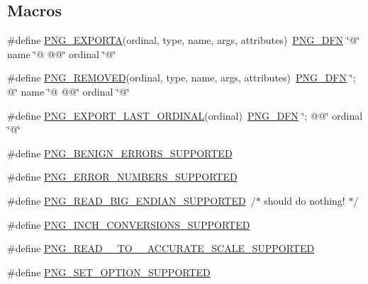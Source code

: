 \subsection*{Macros}
\begin{DoxyCompactItemize}
\item 
\#define \mbox{\hyperlink{third-party_2libpng_2scripts_2symbols_8c_a0b2856104147f9c08a8a465f93f9ed16}{P\+N\+G\+\_\+\+E\+X\+P\+O\+R\+TA}}(ordinal,  type,  name,  args,  attributes)~\mbox{\hyperlink{def_8c_a5a098e8403373ec936600e21c5205f3a}{P\+N\+G\+\_\+\+D\+FN}} \char`\"{}@\char`\"{} name \char`\"{}@ @@\char`\"{} ordinal \char`\"{}@\char`\"{}
\item 
\#define \mbox{\hyperlink{third-party_2libpng_2scripts_2symbols_8c_aeaa0b925c80a0b4c2ae0ef3beffb3c4b}{P\+N\+G\+\_\+\+R\+E\+M\+O\+V\+ED}}(ordinal,  type,  name,  args,  attributes)~\mbox{\hyperlink{def_8c_a5a098e8403373ec936600e21c5205f3a}{P\+N\+G\+\_\+\+D\+FN}} \char`\"{}; @\char`\"{} name \char`\"{}@ @@\char`\"{} ordinal \char`\"{}@\char`\"{}
\item 
\#define \mbox{\hyperlink{third-party_2libpng_2scripts_2symbols_8c_a465e7460be73c52c0f6443e78eee04eb}{P\+N\+G\+\_\+\+E\+X\+P\+O\+R\+T\+\_\+\+L\+A\+S\+T\+\_\+\+O\+R\+D\+I\+N\+AL}}(ordinal)~\mbox{\hyperlink{def_8c_a5a098e8403373ec936600e21c5205f3a}{P\+N\+G\+\_\+\+D\+FN}} \char`\"{}; @@\char`\"{} ordinal \char`\"{}@\char`\"{}
\item 
\#define \mbox{\hyperlink{third-party_2libpng_2scripts_2symbols_8c_a918f7fb0dd09bbf2e4414465198033c9}{P\+N\+G\+\_\+\+B\+E\+N\+I\+G\+N\+\_\+\+E\+R\+R\+O\+R\+S\+\_\+\+S\+U\+P\+P\+O\+R\+T\+ED}}
\item 
\#define \mbox{\hyperlink{third-party_2libpng_2scripts_2symbols_8c_a8c774f16efe436d193da1fc1bcc847e5}{P\+N\+G\+\_\+\+E\+R\+R\+O\+R\+\_\+\+N\+U\+M\+B\+E\+R\+S\+\_\+\+S\+U\+P\+P\+O\+R\+T\+ED}}
\item 
\#define \mbox{\hyperlink{third-party_2libpng_2scripts_2symbols_8c_af60a19d33ea4cf81a0fa513b3a39f483}{P\+N\+G\+\_\+\+R\+E\+A\+D\+\_\+\+B\+I\+G\+\_\+\+E\+N\+D\+I\+A\+N\+\_\+\+S\+U\+P\+P\+O\+R\+T\+ED}}~/$\ast$ should do nothing! $\ast$/
\item 
\#define \mbox{\hyperlink{third-party_2libpng_2scripts_2symbols_8c_a6a353151d7fe132476be036912d75165}{P\+N\+G\+\_\+\+I\+N\+C\+H\+\_\+\+C\+O\+N\+V\+E\+R\+S\+I\+O\+N\+S\+\_\+\+S\+U\+P\+P\+O\+R\+T\+ED}}
\item 
\#define \mbox{\hyperlink{third-party_2libpng_2scripts_2symbols_8c_a63fcb7dd9541dd1bca02ce6489c955f6}{P\+N\+G\+\_\+\+R\+E\+A\+D\+\_\+\_\+\+T\+O\+\_\+\_\+\+A\+C\+C\+U\+R\+A\+T\+E\+\_\+\+S\+C\+A\+L\+E\+\_\+\+S\+U\+P\+P\+O\+R\+T\+ED}}
\item 
\#define \mbox{\hyperlink{third-party_2libpng_2scripts_2symbols_8c_ac3d34a5594cb517fbfb374f0b8875936}{P\+N\+G\+\_\+\+S\+E\+T\+\_\+\+O\+P\+T\+I\+O\+N\+\_\+\+S\+U\+P\+P\+O\+R\+T\+ED}}
\end{DoxyCompactItemize}


